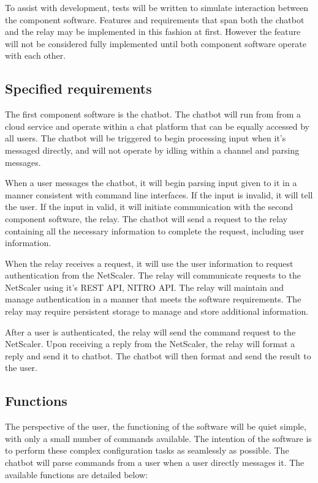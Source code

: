 \documentclass[onecolumn, draftclsnofoot,10pt, compsoc]{IEEEtran}
\begin{document}
To assist with development, tests will be written to simulate interaction between the component software.
Features and requirements that span both the chatbot and the relay may be implemented in this fashion at first.
However the feature will not be considered fully implemented until both component software operate with each other.

\subsection{Specified requirements}
The first component software is the chatbot.
The chatbot will run from from a cloud service and operate within a chat platform that can be equally accessed by all users.
The chatbot will be triggered to begin processing input when it's messaged directly, and will not operate by idling within a channel and parsing messages.

When a user messages the chatbot, it will begin parsing input given to it in a manner consistent with command line interfaces.
If the input is invalid, it will tell the user.
If the input in valid, it will initiate communication with the second component software, the relay.
The chatbot will send a request to the relay containing all the necessary information to complete the request, including user information.

When the relay receives a request, it will use the user information to request authentication from the NetScaler.
The relay will communicate requests to the NetScaler using it's REST API, NITRO API.
The relay will maintain and manage authentication in a manner that meets the software requirements.
The relay may require persistent storage to manage and store additional information.

After a user is authenticated, the relay will send the command request to the NetScaler.
Upon receiving a reply from the NetScaler, the relay will format a reply and send it to chatbot.
The chatbot will then format and send the result to the user.
    
\subsection{Functions}
The perspective of the user, the functioning of the software will be quiet simple, with only a small number of commands available.
The intention of the software is to perform these complex configuration tasks as seamlessly as possible.
The chatbot will parse commands from a user when a user directly messages it.
The available functions are detailed below:
\end{document}
